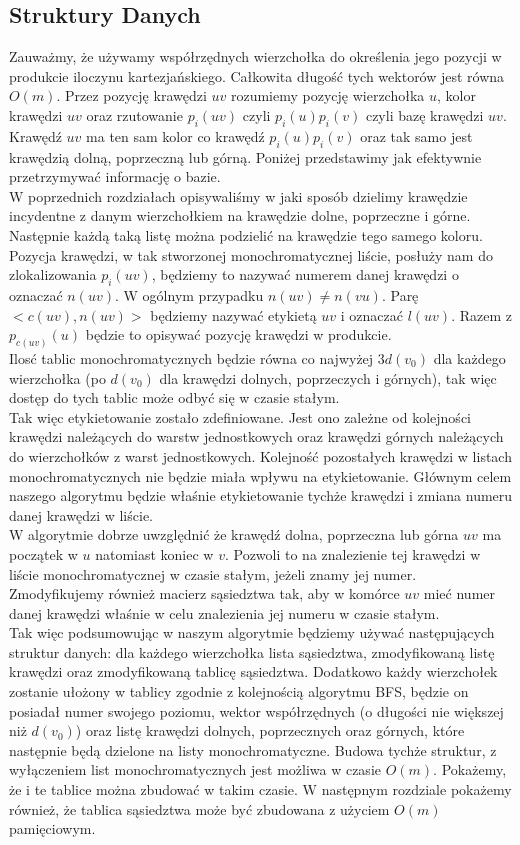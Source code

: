 \documentclass[12pt,a4paper,titlepage]{article}
\begin{document}
\subsection{Struktury Danych}
Zauważmy, że używamy współrzędnych wierzchołka do określenia jego pozycji w produkcie iloczynu kartezjańskiego. Całkowita długość tych wektorów jest równa $O(m)$. Przez pozycję krawędzi $uv$ rozumiemy pozycję wierzchołka $u$, kolor krawędzi $uv$ oraz rzutowanie $p_i (uv)$ czyli $p_i(u) p_i(v)$ czyli bazę krawędzi $uv$. \\
Krawędź $uv$ ma ten sam kolor co krawędź $p_i (u)p_i(v)$ oraz tak samo jest krawędzią dolną, poprzeczną lub górną. Poniżej przedstawimy jak efektywnie przetrzymywać informację o bazie. \\
W poprzednich rozdziałach opisywaliśmy w jaki sposób dzielimy krawędzie incydentne z danym wierzchołkiem na krawędzie dolne, poprzeczne i górne. Następnie każdą taką listę można podzielić na krawędzie tego samego koloru. Pozycja krawędzi, w tak stworzonej monochromatycznej liście, posłuży nam do zlokalizowania $p_i(uv)$, będziemy to nazywać numerem danej krawędzi o oznaczać $n(uv)$. W ogólnym przypadku $n(uv) \neq n(vu)$. Parę $<c(uv), n(uv)>$ będziemy nazywać etykietą $uv$ i oznaczać $l(uv)$. Razem z $p_{c(uv)}(u)$ będzie to opisywać pozycję krawędzi w produkcie. \\
Ilosć tablic monochromatycznych będzie równa co najwyżej $3d(v_0 )$ dla każdego wierzchołka (po $d(v_0)$ dla krawędzi dolnych, poprzeczych i górnych), tak więc dostęp do tych tablic może odbyć się w czasie stałym.\\
Tak więc etykietowanie zostało zdefiniowane. Jest ono zależne od kolejności krawędzi należących do warstw jednostkowych oraz krawędzi górnych należących do wierzchołków z warst jednostkowych. Kolejność pozostałych krawędzi w listach monochromatycznych nie będzie miała wpływu na etykietowanie. Głównym celem naszego algorytmu będzie właśnie etykietowanie tychże krawędzi i zmiana numeru danej krawędzi w liście. \\
W algorytmie dobrze uwzględnić że krawędź dolna, poprzeczna lub górna $uv$ ma początek w $u$ natomiast koniec w $v$. Pozwoli to na znalezienie tej krawędzi w liście monochromatycznej w czasie stałym, jeżeli znamy jej numer. Zmodyfikujemy również macierz sąsiedztwa tak, aby w komórce $uv$ mieć numer danej krawędzi właśnie w celu znalezienia jej numeru w czasie stałym. \\
Tak więc podsumowując w naszym algorytmie będziemy używać następujących struktur danych: dla każdego wierzchołka lista sąsiedztwa, zmodyfikowaną listę krawędzi oraz zmodyfikowaną tablicę sąsiedztwa. Dodatkowo każdy wierzchołek zostanie ułożony w tablicy zgodnie z kolejnością algorytmu BFS, będzie on posiadał numer swojego poziomu, wektor współrzędnych (o długości nie większej niż $d(v_0)$) oraz listę krawędzi dolnych, poprzecznych oraz górnych, które następnie będą dzielone na listy monochromatyczne. Budowa tychże struktur, z wyłączeniem list monochromatycznych jest możliwa w czasie $O(m)$. Pokażemy, że i te tablice można zbudować w takim czasie. W następnym rozdziale pokażemy również, że tablica sąsiedztwa może być zbudowana z użyciem $O(m)$ pamięciowym. \\
\\
\end{document}
